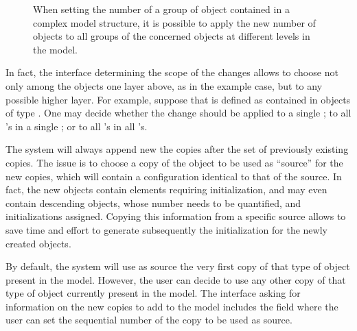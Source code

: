 \documentclass [11pt,a4paper] {book}
\begin{document}
\begin{figure}[ht]
  \centering
  \caption{\small When setting the number of a group of object contained in a complex model structure, it is possible to apply the new number of objects to all groups of the concerned objects at different levels in the model.}
  \label{fig:objnum1}
\end{figure}

In fact, the interface determining the scope of the changes allows to choose not only among the objects one layer above, as in the example case, but to any possible higher layer. For example, suppose that  is defined as contained in objects of type . One may decide whether the change should be applied to a single ; to all 's in a single ; or to all 's in all 's. 

The system will always append new the copies after the set of previously existing copies. The issue is to choose a copy of the object to be used as ``source'' for the new copies, which will contain a configuration identical to that of the source. In fact, the new objects contain elements requiring initialization, and may even contain descending objects, whose number needs to be quantified, and initializations assigned. Copying this information from a specific source allows to save time and effort to generate subsequently the initialization for the newly created objects.

By default, the system will use as source the very first copy of that type of object present in the model. However, the user can decide to use any other copy of that type of object currently present in the model. The interface asking for information on the new copies to add to the model includes the field  where the user can set the sequential number of the copy to be used as source.
\end{document}
